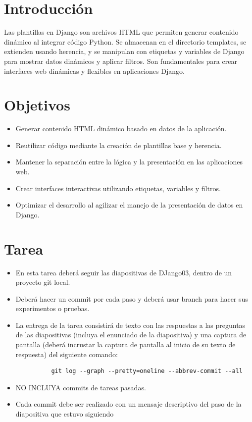 \documentclass{article}
\begin{document}
  \section{Introducción}
    Las plantillas en Django son archivos HTML que permiten generar contenido dinámico al integrar código Python. 
    Se almacenan en el directorio templates, se extienden usando herencia, y se manipulan con etiquetas y variables 
    de Django para mostrar datos dinámicos y aplicar filtros. Son fundamentales para crear interfaces web dinámicas 
    y flexibles en aplicaciones Django.
  

  \section{Objetivos}
    \begin{itemize}
      \item Generar contenido HTML dinámico basado en datos de la aplicación.
      \item Reutilizar código mediante la creación de plantillas base y herencia.
      \item Mantener la separación entre la lógica y la presentación en las aplicaciones web.
      \item Crear interfaces interactivas utilizando etiquetas, variables y filtros.
      \item Optimizar el desarrollo al agilizar el manejo de la presentación de datos en Django.
    \end{itemize}

 
	\section{Tarea}
    \begin{itemize}
      \item En esta tarea deberá seguir las diapositivas de DJango03, dentro de un proyecto git local.
      \item Deberá hacer un commit por cada paso y deberá usar branch para hacer sus experimentos o pruebas.
      \item La entrega de la tarea consistirá de texto con las respuestas a las preguntas de las diapositivas (incluya el enunciado de la diapositiva) y una captura de pantalla (deberá incrustar la captura de pantalla al inicio de su texto de respuesta) del siguiente comando:   
        \begin{verbatim}
          git log --graph --pretty=oneline --abbrev-commit --all
        \end{verbatim}
      \item NO INCLUYA commits de tareas pasadas.
      \item Cada commit debe ser realizado con un mensaje descriptivo del paso de la diapositiva que estuvo siguiendo
    \end{itemize}
  
\end{document}
